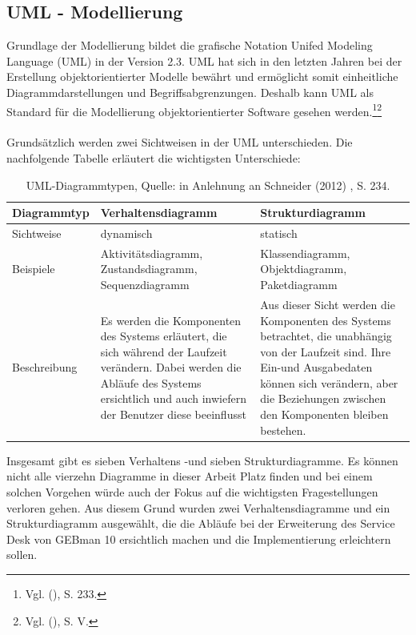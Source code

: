 \newpage


\subsection{UML - Modellierung}
\noindent
Grundlage der Modellierung bildet die grafische Notation Unifed Modeling Language (UML) in der Version 2.3. UML hat sich in den letzten Jahren bei der Erstellung objektorientierter Modelle bewährt und ermöglicht somit einheitliche Diagrammdarstellungen und Begriffsabgrenzungen. Deshalb kann UML als Standard für die Modellierung objektorientierter Software gesehen werden.\footnote{Vgl. \citeauthor{Schneider} (\citeyear{Schneider}), S. 233.}\footnote{Vgl. \citeauthor{Balzert} (\citeyear{Balzert}), S. V.}\\\\
Grundsätzlich werden zwei Sichtweisen in der UML unterschieden. Die nachfolgende Tabelle erläutert die wichtigsten Unterschiede:

\begin{table}[h!]
    \begin{tabular}{ | p{2.5cm}| p{6cm} | p{6cm} |}
    \hline
    Diagrammtyp & Verhaltensdiagramm & Strukturdiagramm \\ \hline
   Sichtweise & dynamisch & statisch \\ \hline
   Beispiele & Aktivitätsdiagramm, Zustandsdiagramm, Sequenzdiagramm &  Klassendiagramm, 
   Objektdiagramm, Paketdiagramm\\ \hline
   Beschreibung &  Es werden die Komponenten des Systems erläutert, die sich während der Laufzeit 
   verändern. Dabei werden die Abläufe des Systems ersichtlich und auch inwiefern der Benutzer diese 
   beeinflusst & Aus dieser Sicht werden die Komponenten des Systems betrachtet, die unabhängig von 
   der Laufzeit sind. Ihre Ein-und Ausgabedaten können sich verändern, aber die Beziehungen zwischen 
   den Komponenten bleiben bestehen. \\ \hline  
    \end{tabular}
    \caption[UML-Diagrammtypen]{UML-Diagrammtypen, Quelle: in Anlehnung an Schneider (2012) , S. 234.}
\end{table}


\noindent
Insgesamt gibt es sieben Verhaltens -und sieben Strukturdiagramme. Es können nicht alle vierzehn Diagramme in dieser Arbeit Platz finden und bei einem solchen Vorgehen würde auch der Fokus auf die wichtigsten Fragestellungen verloren gehen. Aus diesem Grund wurden zwei Verhaltensdiagramme und ein Strukturdiagramm ausgewählt, die die Abläufe bei der Erweiterung des Service Desk von GEBman 10 ersichtlich machen und die Implementierung erleichtern sollen. \\

